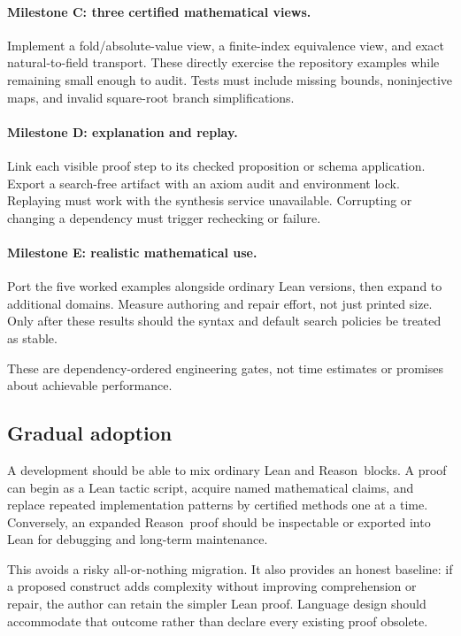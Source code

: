\documentclass[11pt,a4paper]{article}
\newcommand{\Reason}{\textsf{Reason}}
\theoremstyle{remark}
\begin{document}
\paragraph{Milestone C: three certified mathematical views.}
Implement a fold/absolute-value view, a finite-index equivalence view, and exact natural-to-field transport. These directly exercise the repository examples while remaining small enough to audit. Tests must include missing bounds, noninjective maps, and invalid square-root branch simplifications.

\paragraph{Milestone D: explanation and replay.}
Link each visible proof step to its checked proposition or schema application. Export a search-free artifact with an axiom audit and environment lock. Replaying must work with the synthesis service unavailable. Corrupting or changing a dependency must trigger rechecking or failure.

\paragraph{Milestone E: realistic mathematical use.}
Port the five worked examples alongside ordinary Lean versions, then expand to additional domains. Measure authoring and repair effort, not just printed size. Only after these results should the syntax and default search policies be treated as stable.

These are dependency-ordered engineering gates, not time estimates or promises about achievable performance.

\subsection{Gradual adoption}

A development should be able to mix ordinary Lean and \Reason\ blocks. A proof can begin as a Lean tactic script, acquire named mathematical claims, and replace repeated implementation patterns by certified methods one at a time. Conversely, an expanded \Reason\ proof should be inspectable or exported into Lean for debugging and long-term maintenance.

This avoids a risky all-or-nothing migration. It also provides an honest baseline: if a proposed construct adds complexity without improving comprehension or repair, the author can retain the simpler Lean proof. Language design should accommodate that outcome rather than declare every existing proof obsolete.
\end{document}
